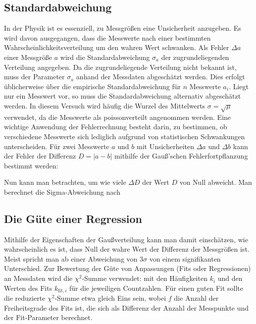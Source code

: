 \subsection{Standardabweichung}
In der Physik ist es essenziell, zu Messgrößen eine Unsicherheit anzugeben. Es wird davon ausgegangen, dass die Messwerte nach einer bestimmten Wahrscheinlichkeitsverteilung um den wahren Wert schwanken. Als Fehler $\Delta a$ einer Messgröße $a$ wird die Standardabweichung $\sigma_a$ der zugrundeliegenden Verteilung angegeben. Da die zugrundeliegende Verteilung nicht bekannt ist, muss der Parameter $\sigma_a$ anhand der Messdaten abgeschätzt werden. Dies erfolgt üblicherweise über die empirische Standardabweichung
für $n$ Messwerte $a_i$. Liegt nur ein Messwert vor, so muss die Standardabweichung alternativ abgeschätzt werden. In diesem Versuch wird häufig die Wurzel des Mittelwerts $\sigma = \sqrt{\mu}$ verwendet, da die Messwerte als poissonverteilt angenommen werden.
Eine wichtige Anwendung der Fehlerrechnung besteht darin, zu bestimmen, ob verschiedene Messwerte sich lediglich aufgrund von statistischen Schwankungen unterscheiden. Für zwei Messwerte $a$ und $b$ mit Unsicherheiten $\Delta a$ und $\Delta b$ kann der Fehler der Differenz $D = |a - b|$ mithilfe der Gauß'schen Fehlerfortpflanzung bestimmt werden:

Nun kann man betrachten, um wie viele $\Delta D$ der Wert $D$ von Null abweicht. Man berechnet die Sigma-Abweichung nach

\subsection{Die Güte einer Regression}
\label{sec:gutePlot}
Mithilfe der Eigenschaften der Gaußverteilung kann man damit einschätzen, wie wahrscheinlich es ist, dass Null der wahre Wert der Differenz der Messgrößen ist. Meist spricht man ab einer Abweichung von $3\sigma$ von einem signifikanten Unterschied.
Zur Bewertung der Güte von Anpassungen (Fits oder Regressionen) an Messdaten wird die $\chi^2$-Summe verwendet:
mit den Häufigkeiten $k_i$ und den Werten des Fits $k_{\text{fit},i}$ für die jeweiligen Countzahlen. Für einen guten Fit sollte die reduzierte $\chi^2$-Summe
etwa gleich Eins sein, wobei $f$ die Anzahl der Freiheitsgrade des Fits ist, die sich als Differenz der Anzahl der Messpunkte und der Fit-Parameter berechnet.


